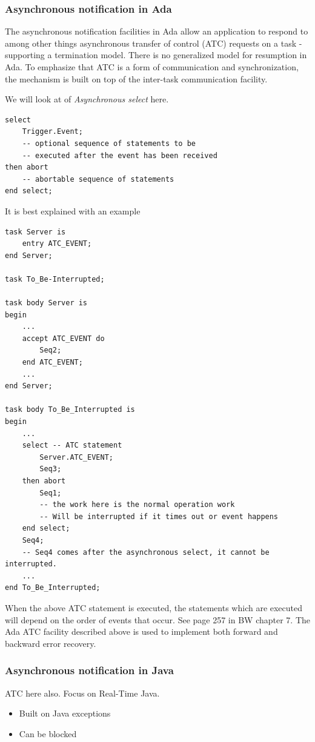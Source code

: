 \subsubsection{Asynchronous notification in Ada}
The asynchronous notification facilities in Ada allow an application to respond to among other things asynchronous transfer of control (ATC) requests on a task - supporting a termination model. There is no generalized model for resumption in Ada. To emphasize that ATC is a form of communication and synchronization, the mechanism  is built on top of the inter-task communication facility.

We will look at of \textit{Asynchronous select} here. 
\newpage
\begin{lstlisting}
select
    Trigger.Event;
    -- optional sequence of statements to be 
    -- executed after the event has been received
then abort
    -- abortable sequence of statements
end select;
\end{lstlisting}
It is best explained with an example
\begin{lstlisting}
task Server is
	entry ATC_EVENT;
end Server;

task To_Be-Interrupted;

task body Server is
begin
	...
    accept ATC_EVENT do 
    	Seq2; 
    end ATC_EVENT;
    ...
end Server;

task body To_Be_Interrupted is
begin
	...
    select -- ATC statement
    	Server.ATC_EVENT;
        Seq3;
    then abort
    	Seq1; 
        -- the work here is the normal operation work
        -- Will be interrupted if it times out or event happens
    end select;
    Seq4;
    -- Seq4 comes after the asynchronous select, it cannot be interrupted.
    ...
end To_Be_Interrupted;
\end{lstlisting}
When the above ATC statement is executed, the statements which are executed will depend on the order of events that occur. See page 257 in BW chapter 7. The Ada ATC facility described above is used to implement both forward and backward error recovery.

\newpage

\subsubsection{Asynchronous notification in Java}
ATC here also. Focus on Real-Time Java.
\begin{itemize}
\item Built on Java exceptions
\item Can be blocked
\end{itemize}




